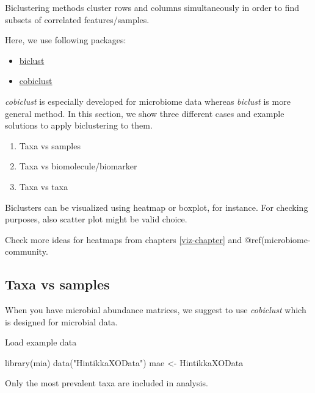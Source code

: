 \documentclass[
]{book}
\newenvironment{Shaded}{\begin{snugshade}}{\end{snugshade}}
\newcommand{\FunctionTok}[1]{\textcolor[rgb]{0.00,0.00,0.00}{#1}}
\newcommand{\NormalTok}[1]{#1}
\newcommand{\OtherTok}[1]{\textcolor[rgb]{0.56,0.35,0.01}{#1}}
\newcommand{\StringTok}[1]{\textcolor[rgb]{0.31,0.60,0.02}{#1}}
\providecommand{\tightlist}{%
  \setlength{\itemsep}{0pt}\setlength{\parskip}{0pt}}
\begin{document}
Biclustering methods cluster rows and columns simultaneously in order
to find subsets of correlated features/samples.

Here, we use following packages:

\begin{itemize}
\tightlist
\item
  \href{https://cran.r-project.org/web/packages/biclust/index.html}{biclust}
\item
  \href{https://besjournals.onlinelibrary.wiley.com/doi/abs/10.1111/2041-210X.13582}{cobiclust}
\end{itemize}

\emph{cobiclust} is especially developed for microbiome data whereas \emph{biclust} is more
general method. In this section, we show three different cases and example
solutions to apply biclustering to them.

\begin{enumerate}
\def\labelenumi{\arabic{enumi}.}
\tightlist
\item
  Taxa vs samples
\item
  Taxa vs biomolecule/biomarker
\item
  Taxa vs taxa
\end{enumerate}

Biclusters can be visualized using heatmap or boxplot, for
instance. For checking purposes, also scatter plot might be valid
choice.

Check more ideas for heatmaps from chapters \ref{viz-chapter} and
@ref(microbiome-community.

\hypertarget{taxa-vs-samples}{%
\subsection{Taxa vs samples}\label{taxa-vs-samples}}

When you have microbial abundance matrices, we suggest to use
\emph{cobiclust} which is designed for microbial data.

Load example data

\begin{Shaded}
\begin{Highlighting}[]
\FunctionTok{library}\NormalTok{(mia)}
\FunctionTok{data}\NormalTok{(}\StringTok{"HintikkaXOData"}\NormalTok{)}
\NormalTok{mae }\OtherTok{\textless{}{-}}\NormalTok{ HintikkaXOData}
\end{Highlighting}
\end{Shaded}

Only the most prevalent taxa are included in analysis.
\end{document}
